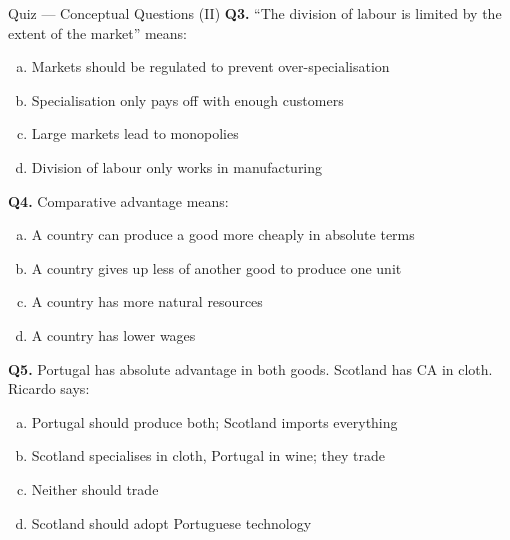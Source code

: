 \documentclass[aspectratio=169, 10pt]{beamer}
\begin{document}
\begin{frame}{Quiz --- Conceptual Questions (II)}
\textbf{Q3.} ``The division of labour is limited by the extent of the
market'' means:
\begin{enumerate}[(a)]
  \item Markets should be regulated to prevent over-specialisation
  \item Specialisation only pays off with enough customers
  \item Large markets lead to monopolies
  \item Division of labour only works in manufacturing
\end{enumerate}
\vspace{0.5em}
\textbf{Q4.} Comparative advantage means:
\begin{enumerate}[(a)]
  \item A country can produce a good more cheaply in absolute terms
  \item A country gives up less of another good to produce one unit
  \item A country has more natural resources
  \item A country has lower wages
\end{enumerate}
\vspace{0.5em}
\textbf{Q5.} Portugal has absolute advantage in both goods. Scotland
has CA in cloth. Ricardo says:
\begin{enumerate}[(a)]
  \item Portugal should produce both; Scotland imports everything
  \item Scotland specialises in cloth, Portugal in wine; they trade
  \item Neither should trade
  \item Scotland should adopt Portuguese technology
\end{enumerate}
\end{frame}
\end{document}
